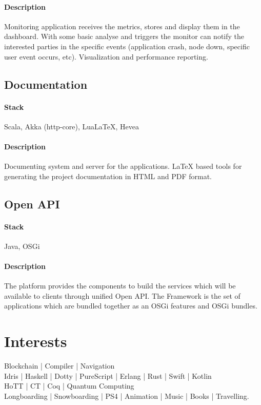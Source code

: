 \paragraph{Description}
Monitoring application receives the metrics, stores and display them in the dashboard. With some basic analyse and triggers the monitor can notify the interested parties in the specific events (application crash, node down, specific user event occurs, etc). Visualization and performance reporting.
\subsection{Documentation}
\paragraph{Stack} Scala, Akka (http-core), LuaLaTeX, Hevea
\paragraph{Description}
Documenting system and server for the applications. LaTeX based tools for generating the project documentation in HTML and PDF format.
\subsection{Open API}
\paragraph{Stack} Java, OSGi
\paragraph{Description}
The platform provides the components to build the services which will be available to clients through unified Open API. The Framework is the set of applications which are bundled together as an OSGi features and OSGi bundles.
\section{Interests}
Blockchain | Compiler | Navigation\\
Idris | Haskell | Dotty | PureScript | Erlang | Rust | Swift | Kotlin\\
HoTT | CT | Coq | Quantum Computing\\
Longboarding | Snowboarding | PS4 | Animation | Music | Books | Travelling.

